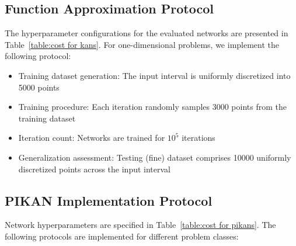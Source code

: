 \subsection{Function Approximation Protocol}
The hyperparameter configurations for the evaluated networks are presented in Table~\ref{table:cost for kans}. For one-dimensional problems, we implement the following protocol:

\begin{itemize}
    \item Training dataset generation: The input interval is uniformly discretized into 5000 points
    \item Training procedure: Each iteration randomly samples 3000 points from the training dataset
    \item Iteration count: Networks are trained for $10^5$ iterations
    \item Generalization assessment: Testing (fine) dataset comprises 10000 uniformly discretized points across the input interval
\end{itemize}

\subsection{PIKAN Implementation Protocol}
Network hyperparameters are specified in Table~\ref{table:cost for pikans}. The following protocols are implemented for different problem classes:

